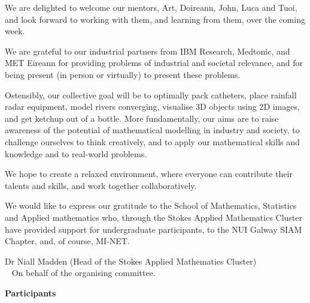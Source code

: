 \documentclass[a4paper, 11pt]{article}
\begin{document}
We are delighted to welcome our mentors,  Art, Doireann, John, Luca and
Tuoi, and look forward to working with them, and learning from them,
over the coming week.

We are grateful to our industrial partners from IBM Research,
Medtonic, and MET Eireann for providing problems of industrial and
societal relevance, and for being present (in person or virtually) to
present these problems.

Ostensibly, our collective goal will be to optimally pack catheters,
place rainfall radar equipment, model rivers converging, visualise 3D
objects using 2D images, and get ketchup out of a bottle.
More fundamentally, our aims  are to raise awareness of the potential
of mathematical modelling in industry and society,
to challenge ourselves to think creatively, and to  apply our
mathematical skills and knowledge and to real-world problems.

We hope to create a relaxed environment, where everyone can contribute
their talents and skills, and  work together collaboratively.

We would like to express our gratitude to the School of Mathematics,
Statistics and Applied mathematics who, through the Stokes Applied
Mathematics Cluster have provided support for  undergraduate
participants, to the NUI Galway SIAM Chapter, and, of  course, MI-NET.

Dr Niall Madden (Head of the Stokes Applied Mathematics Cluster)\\
  \mbox{ \quad }  On behalf of the organising committee.


\newpage

{\textbf{\huge Participants}}\\
\end{document}
